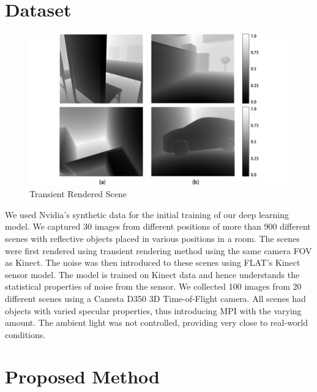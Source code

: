 \documentclass[runningheads]{llncs}
\begin{document}

\section{Dataset} 

\begin{figure}
    \centering
    \includegraphics[scale=0.35]{img/depthmap/raw.png}
    \caption{Transient Rendered Scene}
    \label{fig:result_raw}
\end{figure}

We used Nvidia's synthetic data for the initial training of our deep learning model. We captured 30 images from different positions of more than 900 different scenes with reflective objects placed in various positions in a room. The scenes were first rendered using transient rendering method\cite{jarabo2014} using the same camera FOV as Kinect. The noise was then introduced to these scenes using FLAT's Kinect sensor model. The model is trained on Kinect data and hence understands the statistical properties of noise from the sensor. We collected 100 images from 20 different scenes using a Canesta D350 3D Time-of-Flight camera.  All scenes had objects with varied specular properties, thus introducing MPI with the varying amount. The ambient light was not controlled, providing very close to real-world conditions.



\section{Proposed Method}
\end{document}
